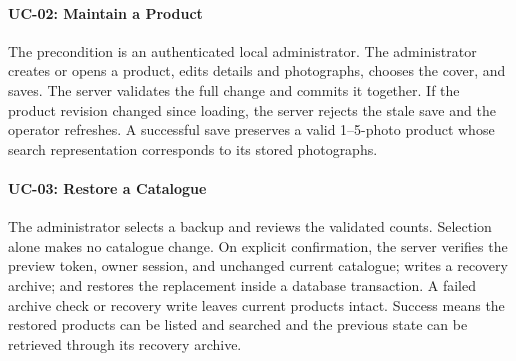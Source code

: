 \paragraph{UC-02: Maintain a Product}
The precondition is an authenticated local administrator. The administrator
creates or opens a product, edits details and photographs, chooses the cover,
and saves. The server validates the full change and commits it together. If the
product revision changed since loading, the server rejects the stale save and
the operator refreshes. A successful save preserves a valid 1--5-photo product
whose search representation corresponds to its stored photographs.

\paragraph{UC-03: Restore a Catalogue}
The administrator selects a backup and reviews the validated counts. Selection
alone makes no catalogue change. On explicit confirmation, the server verifies
the preview token, owner session, and unchanged current catalogue; writes a
recovery archive; and restores the replacement inside a database transaction.
A failed archive check or recovery write leaves current products intact. Success
means the restored products can be listed and searched and the previous state
can be retrieved through its recovery archive.

